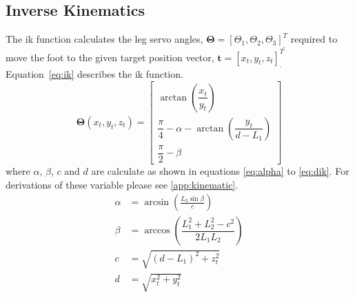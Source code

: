         \newpage
        \subsection{Inverse Kinematics}
            The \ac{ik} function calculates the leg servo angles, \(\bm{\Theta} = [\Theta_1, \Theta_2, \Theta_3]^T_{\displaystyle ,}\) required
            to move the foot to the given target position vector, \(\bm{t} = [x_t,y_t,z_t]^T_{\displaystyle .}\)
            \hbox{Equation \ref{eq:ik}} describes the \ac{ik} function.
            \begin{equation}\label{eq:ik}
                \bm{\Theta}(x_t,y_t,z_t) =
                                    \begin{bmatrix}
                                        \arctan{\left(\dfrac{x_t}{y_t}\right)}\\[0.5cm]
                                        \dfrac{\pi}{4} - \alpha - \arctan{\left(\dfrac{y_t}{d-L_1}\right)}\\[0.5cm]
                                        \dfrac{\pi}{2} - \beta
                                    \end{bmatrix}
            \end{equation}
            where \(\alpha\), \(\beta\), \(c\) and \(d\) are calculate as shown in equations \ref{eq:alpha} to \ref{eq:dik}. For derivations of these variable
            please see \ref{app:kinematic}.
            \begin{align}
                \alpha &= \arcsin{\left(\frac{L_3\sin{\beta}}{c}\right)} \label{eq:alpha} \\[0.5cm]
                \beta &= \arccos{\left(\dfrac{L_1^2 + L_2^2 -c^2}{2L_1L_2}\right)}\\[0.5cm]
                c &= \sqrt{(d-L_1)^2+z_t^2}\\[0.5cm]
                d &= \sqrt{x_t^2 + y_t^2} \label{eq:dik}
            \end{align}
